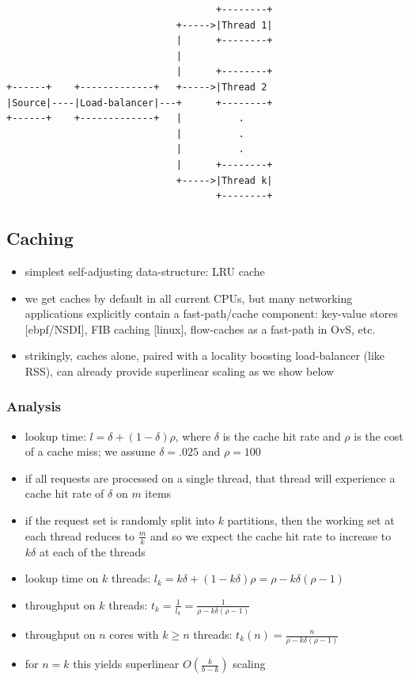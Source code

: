 \documentclass[11pt]{article}
\begin{document}
\begin{verbatim}
                                     +--------+
                              +----->|Thread 1|
                              |      +--------+
                              |
                              |      +--------+
+------+    +-------------+   +----->|Thread 2
|Source|----|Load-balancer|---+      +--------+
+------+    +-------------+   |          .
                              |          .
                              |          .
                              |      +--------+
                              +----->|Thread k|
                                     +--------+
\end{verbatim}

\subsection{Caching}
\label{sec:org431b585}
\begin{itemize}
\item simplest self-adjusting data-structure: LRU cache
\item we get caches by default in all current CPUs, but many networking applications explicitly contain
a fast-path/cache component: key-value stores [ebpf/NSDI], FIB caching [linux], flow-caches as a
fast-path in OvS, etc.
\item strikingly, caches alone, paired with a locality boosting load-balancer (like RSS), can already
provide superlinear scaling as we show below
\end{itemize}
\subsubsection{Analysis}
\label{sec:org8279ab1}
\begin{itemize}
\item lookup time: \(l = \delta + (1-\delta)\rho\), where \(\delta\) is the cache hit rate and \(\rho\) is
the cost of a cache miss; we assume \(\delta=.025\) and \(\rho=100\)
\item if all requests are processed on a single thread, that thread will experience a cache hit rate of
\(\delta\) on \(m\) items
\item if the request set is randomly split into \(k\) partitions, then the working set at each thread
reduces to \(\frac{m}{k}\) and so we expect the cache hit rate to increase to \(k\delta\) at each of
the threads
\item lookup time on \(k\) threads: \(l_k = k\delta + (1-k\delta)\rho = \rho - k\delta(\rho-1)\)
\item throughput on \(k\) threads: \(t_k = \frac1{l_k} = \frac1{\rho - k\delta(\rho-1)}\)
\item throughput on \(n\) cores with \(k\ge n\) threads: \(t_k(n) = \frac{n}{\rho - k\delta(\rho-1)}\)
\item for \(n=k\) this yields superlinear \(O(\frac{k}{b - k})\) scaling
\end{itemize}
\end{document}

